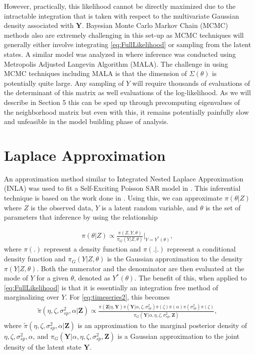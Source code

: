 \documentclass[11pt]{isuthesis}
\begin{document}
	However, practically, this likelihood cannot be directly maximized due to the intractable integration that is taken with respect to the multivariate Gaussian density associated with $\boldsymbol{Y}$.   Bayesian Monte Carlo Markov Chain (MCMC) methods also are extremely challenging in this set-up as MCMC techniques will generally either involve integrating \eqref{eq:FullLikelihood} or sampling from the latent states.  A similar model was analyzed in \cite{mohler2013modeling} where inference was conducted using Metropolis Adjusted Langevin Algorithm (MALA).  The challenge in using MCMC techniques including MALA is that the dimension of $\Sigma(\theta)$ is potentially quite large.  Any sampling of $Y$ will require thousands of evaluations of the determinant of this matrix as well evaluations of the log-likelihood.  As we will describe in Section 5 this can be sped up through precomputing eigenvalues of the neighborhood matrix but even with this, it remains potentially painfully slow and unfeasible in the model building phase of analysis.
	
	\section{Laplace Approximation}
	
	An approximation method similar to Integrated Nested Laplace Approximation (INLA) was used to fit a Self-Exciting Poisson SAR model in \cite{2017arXiv170308429C}.  This inferential technique is based on the work done in \cite{tierney1986accurate}.  Using this, we can approximate $\pi(\theta|Z)$ where $Z$ is the observed data, $Y$ is a latent random variable, and $\theta$ is the set of parameters that inference by using the relationship
	
	\begin{align}
	\pi(\theta|Z)\propto \frac{ \pi(Z,Y,\theta)}{\pi_G(Y|Z,\theta)}\bigg\rvert_{Y=Y^*(\theta)},
	\end{align}
	where $\pi(.)$ represent a density function and $\pi(.|.)$ represent a conditional density function and $\pi_G(Y|Z,\theta)$ is the Gaussian approximation to the density $\pi(Y|Z,\theta)$. Both the numerator and the denominator are then evaluated at the mode of $Y$ for a given $\theta$, denoted as $Y^*(\theta)$.  The benefit of this, when applied to \eqref{eq:FullLikelihood} is that it is essentially an integration free method of marginalizing over $Y$.  For \eqref{eq:timeseries2}, this becomes
	\begin{align}
	\tilde{\pi}(\eta,\zeta,\sigma_{sp}^2,\alpha|\boldsymbol{Z})\propto \frac{\pi(\boldsymbol{Z}|\eta,\boldsymbol{Y})\pi(\boldsymbol{Y}|\alpha,\zeta,\sigma_{sp}^2)\pi(\zeta)\pi(\alpha)\pi(\sigma_{sp}^2)\pi(\zeta)}{\pi_G(\boldsymbol{Y}|\alpha,\eta,\zeta,\sigma_{sp}^2,\boldsymbol{Z})} \label{eq:INLA},
	\end{align}
	where $\tilde{\pi}(\eta,\zeta,\sigma_{sp}^2,\alpha|\boldsymbol{Z})$ is an approximation to the marginal posterior density of $\eta,\zeta,\sigma_{sp}^2,\alpha$, and $\pi_G(\boldsymbol{Y}|\alpha,\eta,\zeta,\sigma_{sp}^2,\boldsymbol{Z})$ is a Gaussian approximation to the joint density of the latent state $\boldsymbol{Y}$. 
	
\end{document}
